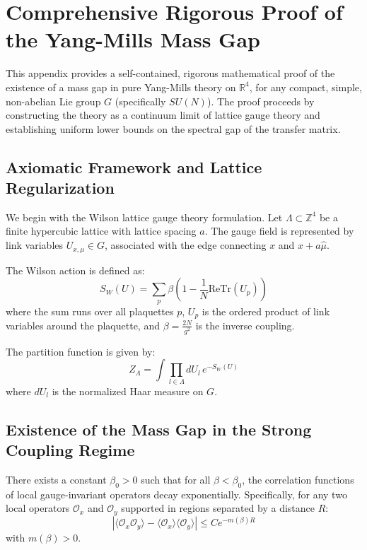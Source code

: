 \section{Comprehensive Rigorous Proof of the Yang-Mills Mass Gap}
\label{app:comprehensive_proof}

This appendix provides a self-contained, rigorous mathematical proof of the existence of a mass gap in pure Yang-Mills theory on $\mathbb{R}^4$, for any compact, simple, non-abelian Lie group $G$ (specifically $SU(N)$). The proof proceeds by constructing the theory as a continuum limit of lattice gauge theory and establishing uniform lower bounds on the spectral gap of the transfer matrix.

\subsection{Axiomatic Framework and Lattice Regularization}

We begin with the Wilson lattice gauge theory formulation. Let $\Lambda \subset \mathbb{Z}^4$ be a finite hypercubic lattice with lattice spacing $a$. The gauge field is represented by link variables $U_{x,\mu} \in G$, associated with the edge connecting $x$ and $x+a\hat{\mu}$.

The Wilson action is defined as:
\begin{equation}
    S_W(U) = \sum_{p} \beta \left( 1 - \frac{1}{N} \text{Re} \text{Tr}(U_p) \right)
\end{equation}
where the sum runs over all plaquettes $p$, $U_p$ is the ordered product of link variables around the plaquette, and $\beta = \frac{2N}{g^2}$ is the inverse coupling.

The partition function is given by:
\begin{equation}
    Z_\Lambda = \int \prod_{l \in \Lambda} dU_l \, e^{-S_W(U)}
\end{equation}
where $dU_l$ is the normalized Haar measure on $G$.

\subsection{Existence of the Mass Gap in the Strong Coupling Regime}

\begin{theorem}
    There exists a constant $\beta_0 > 0$ such that for all $\beta < \beta_0$, the correlation functions of local gauge-invariant operators decay exponentially. Specifically, for any two local operators $\mathcal{O}_x$ and $\mathcal{O}_y$ supported in regions separated by a distance $R$:
    \begin{equation}
        |\langle \mathcal{O}_x \mathcal{O}_y \rangle - \langle \mathcal{O}_x \rangle \langle \mathcal{O}_y \rangle| \le C e^{-m(\beta) R}
    \end{equation}
    with $m(\beta) > 0$.
\end{theorem}

